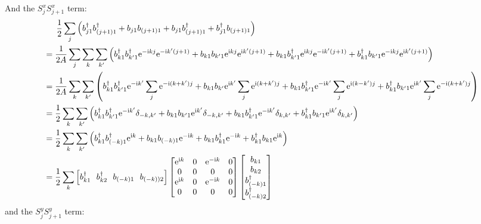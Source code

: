 \documentclass[letter]{article}
\newcommand{\e}{\mathrm{e}}
\newcommand{\ii}{\mathrm{i}}
\begin{document}
And the $S_j^x S_{j+1}^x$ term:
$$\begin{aligned}
    & \indent  \frac{1}{2}\sum_{j}\left(b_{j1}^{\dagger}b_{(j+1)1}^{\dagger}+b_{j1}b_{(j+1)1}+b_{j1}b_{(j+1)1}^{\dagger}+b_{j1}^{\dagger}b_{(j+1)1}\right)\\
    &=\frac{1}{2A}\sum_{j}\sum_{k}\sum_{k'}\left(b_{k1}^{\dagger}b_{k'1}^{\dagger}\e^{-\ii kj}\e^{-\ii k'(j+1)}+b_{k1}b_{k'1}\e^{\ii kj}\e^{\ii k'(j+1)}+b_{k1}b_{k'1}^{\dagger}\e^{\ii kj}\e^{-\ii k'(j+1)}+b_{k1}^{\dagger}b_{k'1}\e^{-\ii kj}\e^{\ii k'(j+1)}\right)\\
    &=\frac{1}{2A}\sum_{k}\sum_{k'}\left(b_{k1}^{\dagger}b_{k'1}^{\dagger}\e^{-\ii k'}\sum_j \e^{-\ii (k+k')j}+b_{k1}b_{k'}\e^{\ii k'}\sum_j \e^{\ii (k+k')j}+b_{k1}b_{k'1}^{\dagger}\e^{-\ii k'}\sum_j \e^{\ii (k-k')j}+b_{k1}^{\dagger}b_{k'1}\e^{\ii k'}\sum_j \e^{-\ii (k+k')j}\right)\\
    &=\frac{1}{2}\sum_k\sum_{k'}\left(b_{k1}^{\dagger}b_{k'1}^{\dagger}\e^{-\ii k'}\delta_{-k,k'}+b_{k1}b_{k'1}\e^{\ii k'}\delta_{-k,k'}+b_{k1}b_{k'1}^{\dagger}\e^{-\ii k'}\delta_{k,k'}+b_{k1}^{\dagger}b_{k'1}\e^{\ii k'}\delta_{k,k'}\right)\\
    &=\frac{1}{2}\sum_k\sum_{k'}\left(b_{k1}^{\dagger}b_{(-k)1}^{\dagger}\e^{\ii k}+b_{k1}b_{(-k)1}\e^{-\ii k}+b_{k1}b_{k1}^{\dagger}\e^{-\ii k}+b_{k1}^{\dagger}b_{k1}\e^{\ii k}\right)\\
    &=\frac{1}{2}\sum_k \left[
      b_{k1}^{\dagger} \ \ 
      b_{k2}^{\dagger}\  \ 
      b_{(-k)1}\ \ 
      b_{(-k))2}\right]
     \begin{bmatrix}
          \e^{\ii k} & 0 & \e^{-\ii k} & 0 \\
         0 &  0 & 0 &0 \\
         \e^{\ii k} &  0 & \e^{-\ii k} &0\\
          0 & 0 & 0& 0
          \end{bmatrix}\begin{bmatrix}
              b_{k1}  \\
              b_{k2}  \\
              b_{(-k)1}^{\dagger}\\
              b_{(-k)2}^{\dagger}
              \end{bmatrix}
  \end{aligned}
  $$
  and the $S_j^y S_{j+1}^y$ term:
\end{document}
